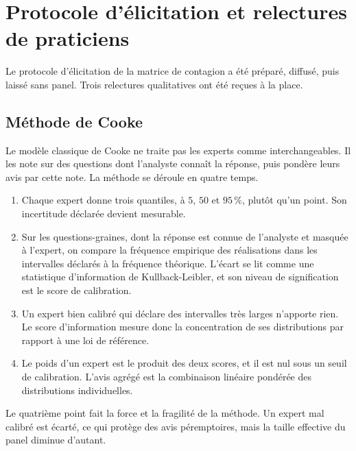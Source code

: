 
\chapter{Protocole d'élicitation et relectures de praticiens}
\label{ch:elicitation}

Le protocole d'élicitation de la matrice de contagion a été préparé, diffusé, puis laissé sans panel.
Trois relectures qualitatives ont été reçues à la place.

\section{Méthode de Cooke}

Le modèle classique de Cooke \citep{Cooke1991} ne traite pas les experts comme interchangeables. Il les note sur des
questions dont l'analyste connaît la réponse, puis pondère leurs avis par cette note. La méthode se
déroule en quatre temps.
\begin{enumerate}[itemsep=3pt,topsep=3pt]
\item Chaque expert donne trois quantiles, à $5$, $50$ et $95\,\%$, plutôt qu'un point. Son incertitude
      déclarée devient mesurable.
\item Sur les questions-graines, dont la réponse est connue de l'analyste et masquée à l'expert, on
      compare la fréquence empirique des réalisations dans les intervalles déclarés à la fréquence
      théorique. L'écart se lit comme une statistique d'information de Kullback-Leibler, et son niveau
      de signification est le score de calibration.
\item Un expert bien calibré qui déclare des intervalles très larges n'apporte rien. Le score
      d'information mesure donc la concentration de ses distributions par rapport à une loi de référence.
\item Le poids d'un expert est le produit des deux scores, et il est nul sous un seuil de calibration.
      L'avis agrégé est la combinaison linéaire pondérée des distributions individuelles.
\end{enumerate}
Le quatrième point fait la force et la fragilité de la méthode. Un expert mal calibré est écarté, ce qui
protège des avis péremptoires, mais la taille effective du panel diminue d'autant.

